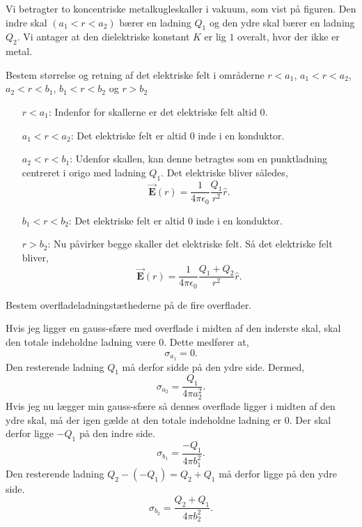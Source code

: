 
\title{\vspace{-1cm}\vspace{-1cm}}
\author{}
\date{}


\pagecolor{color1}
\maketitle
\thispagestyle{fancy}
\begin{exercise}[Opgave 1]
	Vi betragter to koncentriske metalkugleskaller i vakuum, som vist på figuren. Den indre skal $\left( a_1 < r <a_2 \right) $ bærer en ladning $Q_1$ og den ydre skal bærer en ladning $Q_2$. Vi antager at den dielektriske konstant $K$ er lig $1$ overalt, hvor der ikke er metal.
\end{exercise}
\begin{figure}[ht]
    \centering
    \label{fig:opgave1}
\end{figure}
\begin{subexercise}[a]
Bestem størrelse og retning af det elektriske felt i områderne $r<a_1$, $a_1<r<a_2$, $a_2<r<b_1$, $b_1<r<b_2$ og $r>b_2$
\end{subexercise}
\begin{solution}
	\begin{itemize}
		\item[$r<a_1$:]
			Indenfor for skallerne er det elektriske felt altid $0$.
		\item[$a_1<r<a_2$:]
			Det elektriske felt er altid $0$ inde i en konduktor.
		\item[$a_2<r<b_1$:]
			Udenfor skallen, kan denne betragtes som en punktladning centreret i origo med ladning $Q_1$. Det elektriske bliver således,
			\[
				\vec{\mathbf{E}} (r) = \frac{1}{4\pi\epsilon_0}\frac{Q_1}{r^2}\hat{r}
			.\] 
		\item[$b_1<r<b_2$:]
			Det elektriske felt er altid $0$ inde i en konduktor.
		\item[$r>b_2$:]
			Nu påvirker begge skaller det elektriske felt. Så det elektriske felt bliver,
			\[
				\vec{\mathbf{E}} (r) = \frac{1}{4\pi\epsilon_0}\frac{Q_1+Q_2}{r^2}\hat{r}
			.\] 
	\end{itemize}
\end{solution}
\begin{subexercise}[b]
	Bestem overfladeladningstæthederne på de fire overflader.
\end{subexercise}
\begin{solution}
Hvis jeg ligger en gauss-sfære med overflade i midten af den inderste skal, skal den totale indeholdne ladning være $0$. Dette medfører at,
 \[
\sigma_{a_1} = 0
.\] 
Den resterende ladning $Q_1$ må derfor sidde på den ydre side. Dermed,
\[
\sigma_{a_2} = \frac{Q_1}{4\pi a_2^2}
.\]
Hvis jeg nu lægger min gauss-sfære så dennes overflade ligger i midten af den ydre skal, må der igen gælde at den totale indeholdne ladning er 0. Der skal derfor ligge $-Q_1$ på den indre side.
\[
\sigma_{b_1} = \frac{-Q_1}{4\pi b_1^2}
.\]
Den resterende ladning $Q_2 - (-Q_1) = Q_2+Q_1$ må derfor ligge på den ydre side.
\[
\sigma_{b_2} = \frac{Q_2+Q_1}{4\pi b_{2}^2}
.\] 
\end{solution}
